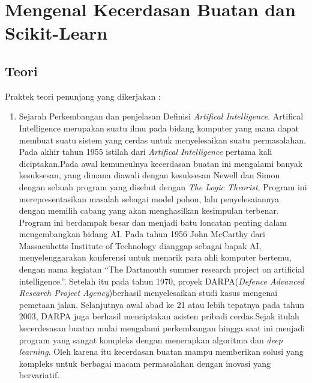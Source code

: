 \chapter{Mengenal Kecerdasan Buatan dan Scikit-Learn}

\section{Teori}
Praktek teori penunjang yang dikerjakan :
\begin{enumerate}
\item Sejarah Perkembangan dan penjelasan Definisi \textit{Artifical Intelligence}. Artifical Intelligence merupakan suatu ilmu pada bidang komputer yang mana dapat membuat suatu sistem yang cerdas untuk menyelesaikan suatu permasalahan.\\
Pada akhir tahun 1955 istilah dari \textit{Artifical Intelligence} pertama kali diciptakan.Pada awal kemunculnya kecerdasan buatan ini mengalami banyak kesuksesan, yang dimana diawali dengan kesuksesan Newell dan Simon dengan sebuah program yang disebut dengan \textit{The Logic Theorist}, Program ini merepresentasikan  masalah sebagai model pohon, lalu penyelesaiannya dengan  memilih cabang yang akan menghasilkan kesimpulan terbenar. Program ini berdampak besar dan menjadi batu loncatan penting dalam mengembangkan bidang AI. Pada tahun 1956 John McCarthy dari  Massacuhetts Institute of Technology dianggap sebagai bapak AI, menyelenggarakan konferensi untuk menarik para ahli komputer bertemu, dengan  nama kegiatan “The Dartmouth summer research project on artificial intelligence.”. Setelah itu pada tahun 1970, proyek DARPA(\textit{Defence Advanced Research Project Agency})berhasil menyelesaikan studi kasus mengenai pemetaan jalan. Selanjutnya awal abad ke 21 atau lebih tepatnya pada tahun 2003, DARPA juga berhasil menciptakan asisten pribadi cerdas.Sejak itulah kecerdesasan buatan mulai mengalami perkembangan hingga saat ini menjadi program yang sangat kompleks dengan menerapkan algoritma dan \textit{deep learning}. Oleh karena itu kecerdasan buatan mampu memberikan solusi yang kompleks untuk berbagai macam permasalahan dengan inovasi yang bervariatif.


\end{enumerate}
